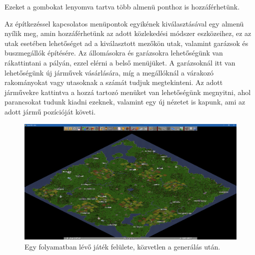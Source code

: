 Ezeket a gombokat lenyomva tartva több almenü ponthoz is hozzáférhetünk.

Az építkezéssel kapcsolatos menüpontok egyikének kiválasztásával egy almenü nyílik meg, amin hozzáférhetünk az adott közlekedési módszer eszközeihez, ez az utak esetében lehetőséget ad a kiválasztott mezőkön utak, valamint garázsok és buszmegállók építésére. Az állomásokra és garázsokra lehetőségünk van rákattintani a pályán, ezzel elérni a belső menüjüket. A garázsoknál itt van lehetőségünk új járművek vásárlására, míg a megállóknál a várakozó rakományokat vagy utasoknak a számát tudjuk megtekinteni. Az adott járművekre kattintva a hozzá tartozó menüket van lehetőségünk megnyitni, ahol parancsokat tudunk kiadni ezeknek, valamint egy új nézetet is kapunk, ami az adott jármű pozícióját követi.

\begin{figure}
	\centering
	\includegraphics[scale=0.3]{images/palya.png}
	\caption{Egy folyamatban lévő játék felülete, közvetlen a generálás után.}
	\label{fig:palya}
\end{figure}

